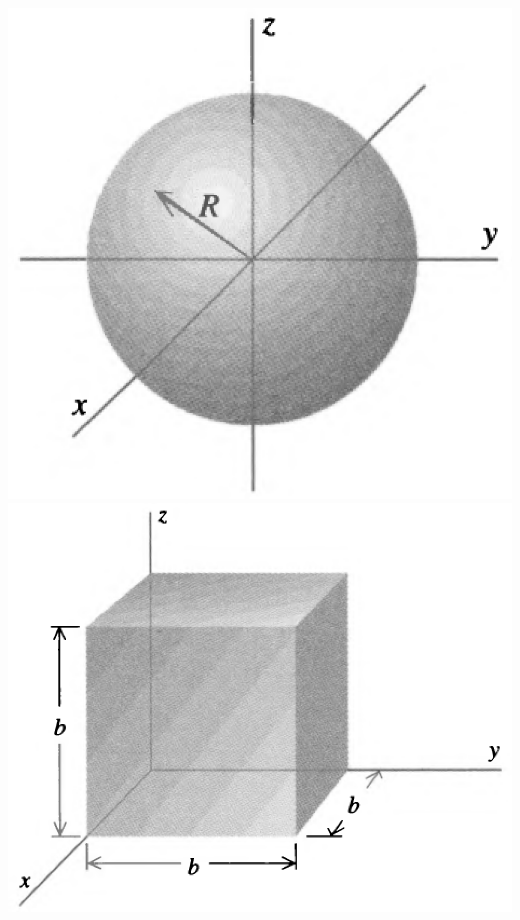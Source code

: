 \documentclass[11pt,letterpaper,boxed]{hmcpset}
\begin{document}
\begin{problem}[HRK E27.11]
\begin{center}
			\includegraphics[scale=0.2]{II-10c.png}
			\includegraphics[scale=0.2]{II-10d.png}
		\end{center}
		
		
	\end{problem}
	
	\begin{solution}
		\vfill
	\end{solution}
	\newpage	
	
\end{document}
